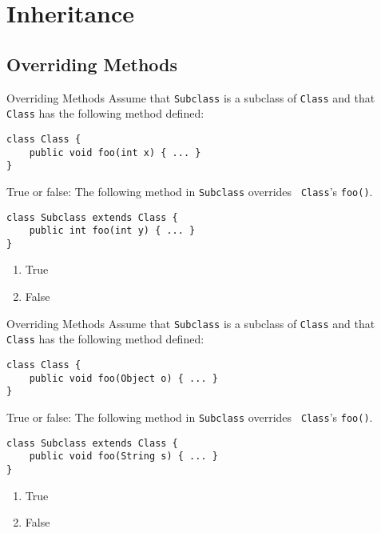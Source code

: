 \documentclass[9pt]{beamer}
\begin{document}
\section{Inheritance}
\subsection{Overriding Methods}
\begin{frame}[fragile]{Overriding Methods}
  Assume that {\tt Subclass} is a subclass of {\tt Class} and that {\tt
  Class} has the following method defined:

  \begin{lstlisting}
class Class {
    public void foo(int x) { ... }
}
  \end{lstlisting}

  True or false: The following method in {\tt Subclass} overrides {\tt
  Class}'s {\tt foo()}.

  \begin{lstlisting}
class Subclass extends Class {
    public int foo(int y) { ... }
}
  \end{lstlisting}

  \begin{enumerate}
    \item
      True
    \item
      \alert<2>{False}
  \end{enumerate}
\end{frame}

\begin{frame}[fragile]{Overriding Methods}
  Assume that {\tt Subclass} is a subclass of {\tt Class} and that {\tt
  Class} has the following method defined:

  \begin{lstlisting}
class Class {
    public void foo(Object o) { ... }
}
  \end{lstlisting}

  True or false: The following method in {\tt Subclass} overrides {\tt
  Class}'s {\tt foo()}.

  \begin{lstlisting}
class Subclass extends Class {
    public void foo(String s) { ... }
}
  \end{lstlisting}

  \begin{enumerate}
    \item
      True
    \item
      \alert<2>{False}
  \end{enumerate}
\end{frame}
\end{document}
